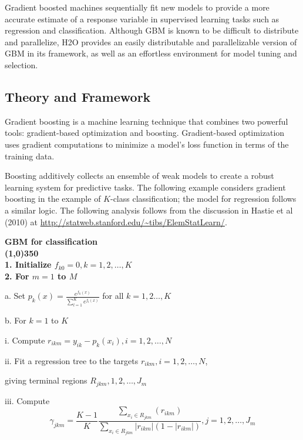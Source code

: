 Gradient boosted machines sequentially fit new models to provide a more accurate estimate of a response variable in supervised learning tasks such as regression and classification. Although GBM is known to be difficult to distribute and parallelize, H2O provides an easily distributable and parallelizable version of GBM in its framework, as well as an effortless environment for model tuning and selection.


\subsection{Theory and Framework}

Gradient boosting is a machine learning technique that combines two powerful tools: gradient-based optimization and
boosting. Gradient-based optimization uses gradient computations to minimize a model's loss function in terms of
the training data. 

Boosting additively collects an ensemble of weak models to create a robust 
learning system for predictive tasks. The following example considers gradient boosting in the example of $K$-class classification; the model for regression follows a similar logic. The following analysis follows from the discussion in
Hastie et al (2010) at {\url{http://statweb.stanford.edu/~tibs/ElemStatLearn/}}.

\bf{\footnotesize{GBM for classification}}
\normalfont
\\
\line(1,0){350}
\\
1. Initialize $f_{k0} = 0, k = 1,2,\dots,K$
\\
2. For $m=1$ to $M$

\hspace{1cm} a. Set $p_k(x) = \frac{e^{f_k(x)}}{\sum_{l=1}^K e^{f_l(x)}}$ for all $k = 1,2\dots, K$

\hspace{1cm} b. For $k=1$ to $K$

\hspace{2cm} i. Compute $r_{ikm} = y_{ik} - p_k(x_i),  i = 1,2,\dots,N$

\hspace{2cm} ii. Fit a regression tree to the targets $r_{ikm}, i = 1,2,\dots,N$,
\par \hspace{2.5cm} giving terminal regions $R_{jkm}, 1,2,\dots,J_m$

\hspace{2cm}iii. Compute $$\gamma_{jkm} = \frac{K-1}{K} \frac{\sum_{x_i \in R_{jkm}} (r_{ikm})}{\sum_{x_i \in R_{jkm}} |r_{ikm}| (1 - |r_{ikm}|)} , j=1,2,\dots,J_m$$


